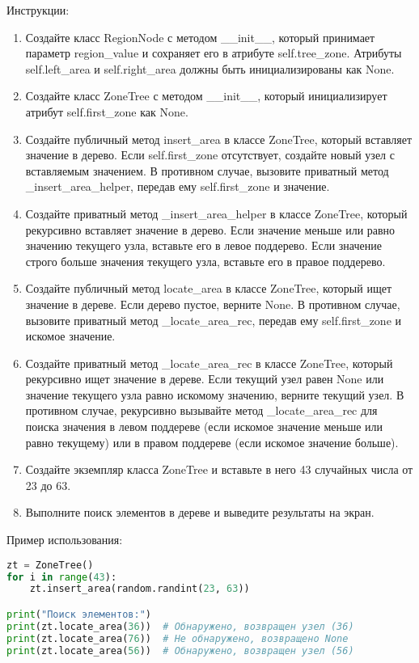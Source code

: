 \begin{enumerate}
Инструкции:
\begin{enumerate}
    \item Создайте класс RegionNode с методом \_\_init\_\_, который принимает параметр region\_value и сохраняет его в атрибуте self.tree\_zone. Атрибуты self.left\_area и self.right\_area должны быть инициализированы как None.
    \item Создайте класс ZoneTree с методом \_\_init\_\_, который инициализирует атрибут self.first\_zone как None.
    \item Создайте публичный метод insert\_area в классе ZoneTree, который вставляет значение в дерево. Если self.first\_zone отсутствует, создайте новый узел с вставляемым значением. В противном случае, вызовите приватный метод \_insert\_area\_helper, передав ему self.first\_zone и значение.
    \item Создайте приватный метод \_insert\_area\_helper в классе ZoneTree, который рекурсивно вставляет значение в дерево. Если значение меньше или равно значению текущего узла, вставьте его в левое поддерево. Если значение строго больше значения текущего узла, вставьте его в правое поддерево.
    \item Создайте публичный метод locate\_area в классе ZoneTree, который ищет значение в дереве. Если дерево пустое, верните None. В противном случае, вызовите приватный метод \_locate\_area\_rec, передав ему self.first\_zone и искомое значение.
    \item Создайте приватный метод \_locate\_area\_rec в классе ZoneTree, который рекурсивно ищет значение в дереве. Если текущий узел равен None или значение текущего узла равно искомому значению, верните текущий узел. В противном случае, рекурсивно вызывайте метод \_locate\_area\_rec для поиска значения в левом поддереве (если искомое значение меньше или равно текущему) или в правом поддереве (если искомое значение больше).
    \item Создайте экземпляр класса ZoneTree и вставьте в него 43 случайных числа от 23 до 63.
    \item Выполните поиск элементов в дереве и выведите результаты на экран.
\end{enumerate}

Пример использования:
\begin{lstlisting}[language=Python]
zt = ZoneTree()
for i in range(43):
    zt.insert_area(random.randint(23, 63))

print("Поиск элементов:")
print(zt.locate_area(36))  # Обнаружено, возвращен узел (36)
print(zt.locate_area(76))  # Не обнаружено, возвращено None
print(zt.locate_area(56))  # Обнаружено, возвращен узел (56)
\end{lstlisting}


\end{enumerate}
